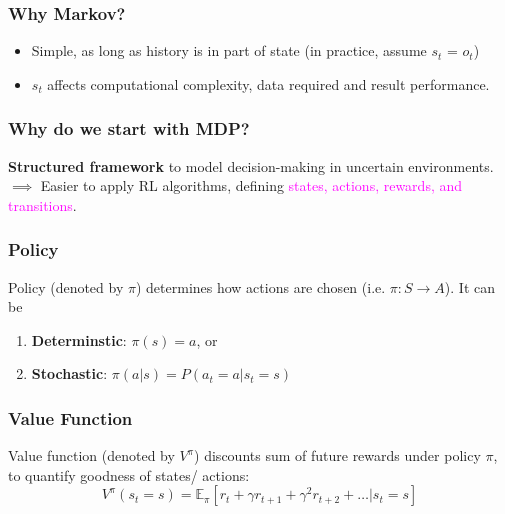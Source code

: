 \documentclass{article}
\begin{document}
\begin{hintbox}
    \subsubsection*{Why Markov?}
    \begin{prfbox}
        \begin{itemize}
            \item Simple, as long as history is in part of state (in practice, assume $s_t$ = $o_t$)
            \item $s_t$ affects computational complexity, data required and result performance.
        \end{itemize}
    \end{prfbox}
    \subsubsection*{Why do we start with MDP?}
    \begin{prfbox}
        \textbf{Structured framework} to model decision-making in uncertain environments.
        \\ $\implies$ Easier to apply RL algorithms, defining \textcolor{magenta}{states, actions, rewards, and transitions}.
    \end{prfbox}
\end{hintbox}

\subsubsection*{Policy}
Policy (denoted by $\pi$) determines how actions are chosen (i.e. $\pi: S → A$). It can be
\begin{enumerate}
\item \textbf{Determinstic}: $\pi(s) = a$, or
\item \textbf{Stochastic}: $\pi(a | s) = P(a_t = a |  s_t = s)$
\end{enumerate}

\subsubsection*{Value Function}
Value function (denoted by $V^{\pi}$) discounts sum of future rewards under policy $\pi$, to quantify goodness of states/ actions:
\begin{equation*}
  V^{\pi}(s_t = s) = \mathbb{E}_{\pi} \left[ r_t + \gamma r_{t+1} + \gamma^2 r_{t+2} + \dots | s_t = s \right]
\end{equation*}
\end{document}
